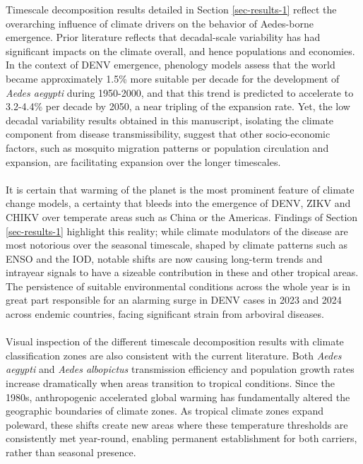 \documentclass[10pt,twocolumn]{wlscirep}
\begin{document}
Timescale decomposition results detailed in Section \ref{sec-results-1} reflect the overarching influence of climate drivers on the behavior of Aedes-borne emergence. Prior literature reflects that decadal-scale variability has had significant impacts on the climate overall, and hence populations and economies\cite{thomson_2018b}. In the context of DENV emergence, phenology models assess that the world became approximately 1.5\% more suitable per decade for the development of \textit{Aedes aegypti} during 1950-2000, and that this trend is predicted to accelerate to 3.2-4.4\% per decade by 2050, a near tripling of the expansion rate\cite{iwamura_2020}. Yet, the low decadal variability results obtained in this manuscript, isolating the climate component from disease transmissibility, suggest that other socio-economic factors, such as mosquito migration patterns or population circulation and expansion, are facilitating expansion over the longer timescales.
\\
\\
It is certain that warming of the planet is the most prominent feature of climate change models\cite{ipcc_2025}, a certainty that bleeds into the emergence of DENV, ZIKV and CHIKV over temperate areas such as China or the Americas. Findings of Section \ref{sec-results-1} highlight this reality; while climate modulators of the disease are most notorious over the seasonal timescale, shaped by climate patterns such as ENSO and the IOD, notable shifts are now causing long-term trends and intrayear signals to have a sizeable contribution in these and other tropical areas. The persistence of suitable environmental conditions across the whole year is in great part responsible for an alarming surge in DENV cases in 2023 and 2024 across endemic countries, facing significant strain from arboviral diseases\cite{lim_2025}.
\\
\\
Visual inspection of the different timescale decomposition results with climate classification zones are also consistent with the current literature. Both \textit{Aedes aegypti} and \textit{Aedes albopictus} transmission efficiency and population growth rates increase dramatically when areas transition to tropical conditions. Since the 1980s, anthropogenic accelerated global warming has fundamentally altered the geographic boundaries of climate zones\cite{laporta_2023}. As tropical climate zones expand poleward, these shifts create new areas where these temperature thresholds are consistently met year-round, enabling permanent establishment for both carriers, rather than seasonal presence\cite{ryan_2019}.
\end{document}
